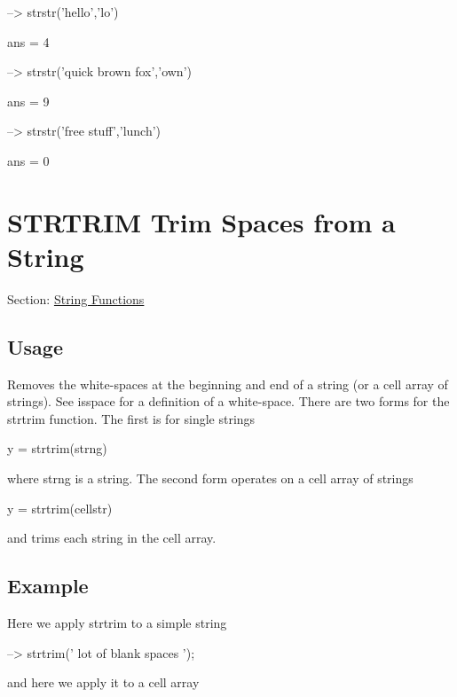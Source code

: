 \begin{DoxyVerbInclude}
--> strstr('hello','lo')

ans = 
 4 

--> strstr('quick brown fox','own')

ans = 
 9 

--> strstr('free stuff','lunch')

ans = 
 0 
\end{DoxyVerbInclude}
 \hypertarget{string_strtrim}{}\section{S\-T\-R\-T\-R\-I\-M Trim Spaces from a String}\label{string_strtrim}
Section\-: \hyperlink{sec_string}{String Functions} \hypertarget{vtkwidgets_vtkxyplotwidget_Usage}{}\subsection{Usage}\label{vtkwidgets_vtkxyplotwidget_Usage}
Removes the white-\/spaces at the beginning and end of a string (or a cell array of strings). See {\ttfamily isspace} for a definition of a white-\/space. There are two forms for the {\ttfamily strtrim} function. The first is for single strings \begin{DoxyVerb}   y = strtrim(strng)
\end{DoxyVerb}
 where {\ttfamily strng} is a string. The second form operates on a cell array of strings \begin{DoxyVerb}   y = strtrim(cellstr)
\end{DoxyVerb}
 and trims each string in the cell array. \hypertarget{variables_struct_Example}{}\subsection{Example}\label{variables_struct_Example}
Here we apply {\ttfamily strtrim} to a simple string


\begin{DoxyVerbInclude}
--> strtrim('  lot of blank spaces    ');
\end{DoxyVerbInclude}


and here we apply it to a cell array


